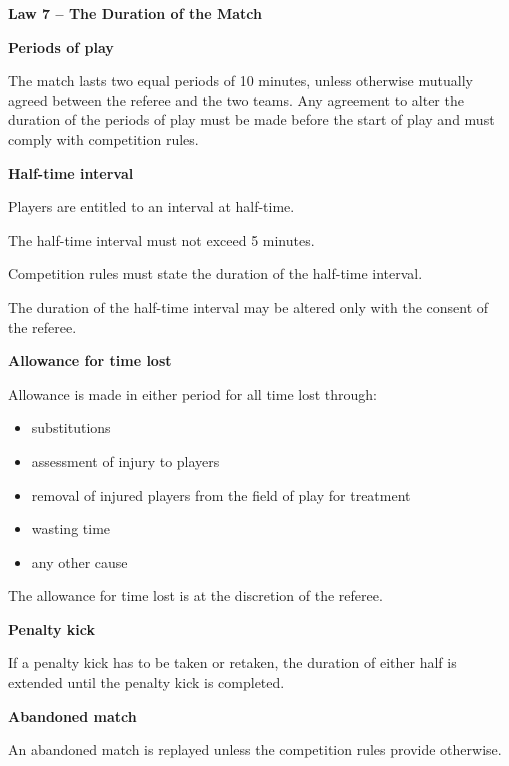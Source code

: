 \clearpage
\sffamily
{\bfseries\color[rgb]{0.4,0.4,0.4}
Law 7 -- The Duration of the Match}
{}

\bigskip

{\bfseries Periods of play }

\headlinebox

The match lasts two equal periods of 10 minutes,
unless otherwise mutually agreed between the referee and the two teams.
Any agreement to alter the duration of the periods of play must be made before
the start of play and must comply with competition rules.

\bigskip

{\bfseries Half-time interval}

\headlinebox

Players are entitled to an interval at half-time.

The half-time interval must not exceed 5 minutes.

Competition rules must state the duration of the half-time interval.

The duration of the half-time interval may be altered only with the consent of the referee. 

\bigskip

{\bfseries Allowance for time lost}

\headlinebox

Allowance is made in either period for all time lost through: 

\begin{itemize}
\item substitutions
\item assessment of injury to players
\item removal of injured players from the field of play for treatment 
\item wasting time
\item any other cause
\end{itemize}

The allowance for time lost is at the discretion of the referee.

\bigskip

{\bfseries Penalty kick}

\headlinebox

If a penalty kick has to be taken or retaken, the duration of either half is extended until the penalty kick is completed.

\bigskip

{\sffamily
\textbf{Abandoned match} }

\headlinebox

An abandoned match is replayed unless the competition rules provide otherwise.
